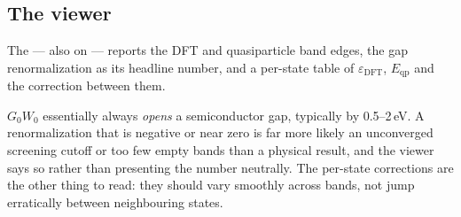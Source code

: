 \subsection{The viewer}

The  --- also on \menusep{} ---
reports the DFT and quasiparticle band edges, the gap renormalization as its
headline number, and a per-state table of $\varepsilon_{\text{DFT}}$,
$E_{\text{qp}}$ and the correction between them.

\begin{calnote}
$G_0W_0$ essentially always \emph{opens} a semiconductor gap, typically by
0.5--2\,eV. A renormalization that is negative or near zero is far more likely
an unconverged screening cutoff or too few empty bands than a physical result,
and the viewer says so rather than presenting the number neutrally. The
per-state corrections are the other thing to read: they should vary smoothly
across bands, not jump erratically between neighbouring states.
\end{calnote}
